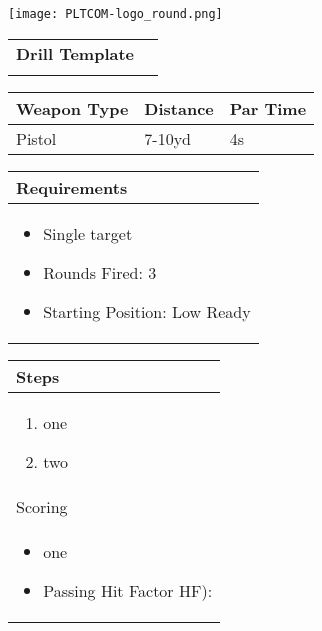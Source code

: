 \documentclass[../Cover.tex]{subfiles}
\begin{document}
	\begin{minipage}[t][0.2\textheight][t]{0.1\textwidth} 
		\texttt{[image: PLTCOM-logo\_round.png]}
	\end{minipage}
	\hfill
	\begin{minipage}[t][0.2\textheight][t]{0.8\textwidth}
		\begin{tabular}{ p{} l  }
			\\
			\textbf{Drill Template} \\
			\\[0.09\textheight]
		\end{tabular}
		\quad
		\begin{tabular}{ | p{} | p{} | p{} |}
			\hline
			\rowcolor[HTML]{C0C0C0}\tiny Weapon Type & \tiny Distance & \tiny Par Time\\ 
			\hline
			\tiny Pistol & \tiny 7-10yd& \tiny 4s \\ %
			\hline
		\end{tabular}
	\end{minipage}
	\begin{tabular}{p{}}
		\small Requirements \\
		\hline
		\tiny \begin{itemize} %
			\item Single target			
			\item Rounds Fired: 3
			\item Starting Position: Low Ready
		\end{itemize}		
		\begin{center}
			
		\end{center}		
		\\[0.6\textheight]
	\end{tabular}
	\begin{tabular}{ | p{} |}
		\hline
		\rowcolor[HTML]{C0C0C0}Steps\\ 
		\hline
		\tiny \begin{enumerate}[topsep=0pt, partopsep=0pt]
			\item one %
			\item two
		\end{enumerate}		
		\\ [0.25\textheight]
		\hline
		\rowcolor[HTML]{C0C0C0}Scoring \\
		\hline
		\tiny \begin{itemize}[topsep=0pt, partopsep=0pt]
			\item one %
			\item Passing Hit Factor HF): 
		\end{itemize}		
		\\ [0.25\textheight]
		\hline
	\end{tabular}
\end{document}
